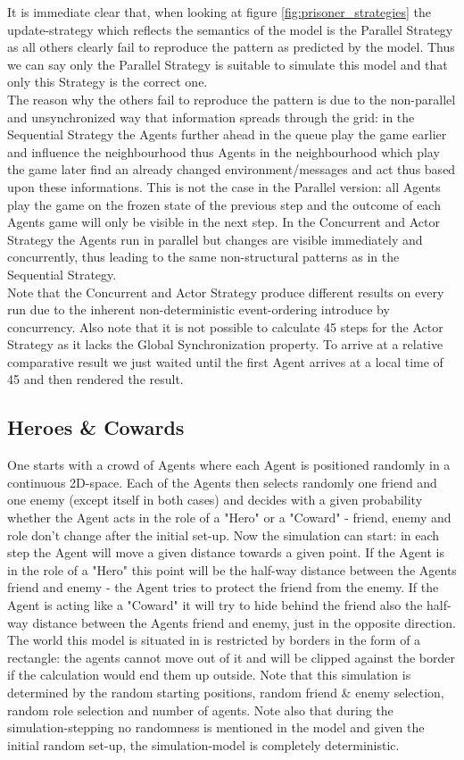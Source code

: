 It is immediate clear that, when looking at figure \ref{fig:prisoner_strategies} the update-strategy which reflects the semantics of the model is the Parallel Strategy as all others clearly fail to reproduce the pattern as predicted by the model. Thus we can say only the Parallel Strategy is suitable to simulate this model and that only this Strategy is the correct one. \\
The reason why the others fail to reproduce the pattern is due to the non-parallel and unsynchronized way that information spreads through the grid: in the Sequential Strategy the Agents further ahead in the queue play the game earlier and influence the neighbourhood thus Agents in the neighbourhood which play the game later find an already changed environment/messages and act thus based upon these informations. This is not the case in the Parallel version: all Agents play the game on the frozen state of the previous step and the outcome of each Agents game will only be visible in the next step. In the Concurrent and Actor Strategy the Agents run in parallel but changes are visible immediately and concurrently, thus leading to the same non-structural patterns as in the Sequential Strategy. \\
Note that the Concurrent and Actor Strategy produce different results on every run due to the inherent non-deterministic event-ordering introduce by concurrency. Also note that it is not possible to calculate 45 steps for the Actor Strategy as it lacks the Global Synchronization property. To arrive at a relative comparative result we just waited until the first Agent arrives at a local time of 45 and then rendered the result. 

\subsection{Heroes \& Cowards}
One starts with a crowd of Agents where each Agent is positioned randomly in a continuous 2D-space. Each of the Agents then selects randomly one friend and one enemy (except itself in both cases) and decides with a given probability whether the Agent acts in the role of a "Hero" or a "Coward" - friend, enemy and role don't change after the initial set-up. Now the simulation can start: in each step the Agent will move a given distance towards a given point. If the Agent is in the role of a "Hero" this point will be the half-way distance between the Agents friend and enemy - the Agent tries to protect the friend from the enemy. If the Agent is acting like a "Coward" it will try to hide behind the friend also the half-way distance between the Agents friend and enemy, just in the opposite direction. The world this model is situated in is restricted by borders in the form of a rectangle: the agents cannot move out of it and will be clipped against the border if the calculation would end them up outside. Note that this simulation is determined by the random starting positions, random friend \& enemy selection, random role selection and number of agents. Note also that during the simulation-stepping no randomness is mentioned in the model and given the initial random set-up, the simulation-model is completely deterministic.  \\

